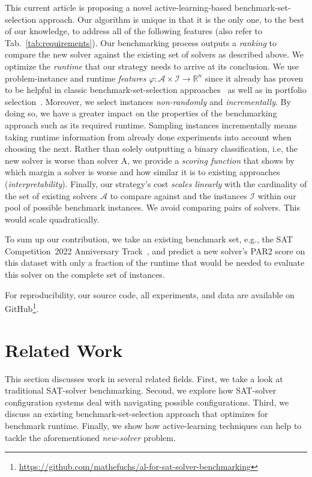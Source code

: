 \documentclass[runningheads]{llncs}
\begin{document}
This current article is proposing a novel active-learning-based benchmark-set-selection approach.
Our algorithm is unique in that it is the only one, to the best of our knowledge, to address all of the following features (also refer to Tab.~\ref{tab:requirements}).
Our benchmarking process outputs a \textit{ranking} to compare the new solver against the existing set of solvers as described above.
We optimize the \textit{runtime} that our strategy needs to arrive at its conclusion.
We use problem-instance and runtime \textit{features} $\varphi\!: \mathcal{A} \times \mathcal{I} \rightarrow \mathbb{R}^n$ since it already has proven to be helpful in classic benchmark-set-selection approaches~\cite{HoosKSS13} as well as in portfolio selection~\cite{CollauttiMMO13,NgokoCT19}.
Moreover, we select instances \textit{non-randomly} and \textit{incrementally}.
By doing so, we have a greater impact on the properties of the benchmarking approach such as its required runtime.
Sampling instances incrementally means taking runtime information from already done experiments into account when choosing the next.
Rather than solely outputting a binary classification, i.e, the new solver is worse than solver A, we provide a \textit{scoring function} that shows by which margin a solver is worse and how similar it is to existing approaches (\textit{interpretability}).
Finally, our strategy's cost \textit{scales linearly} with the cardinality of the set of existing solvers $\mathcal{A}$ to compare against and the instances $\mathcal{I}$ within our pool of possible benchmark instances.
We avoid comparing pairs of solvers.
This would scale quadratically.

To sum up our contribution, we take an existing benchmark set, e.g., the SAT Competition~2022 Anniversary Track~\cite{sat2022}, and predict a new solver's PAR2 score on this dataset with only a fraction of the runtime that would be needed to evaluate this solver on the complete set of instances.

For reproducibility, our source code, all experiments, and data are available on GitHub\footnote{\url{https://github.com/mathefuchs/al-for-sat-solver-benchmarking}}.


\section{Related Work}
This section discusses work in several related fields.
First, we take a look at traditional SAT-solver benchmarking.
Second, we explore how SAT-solver configuration systems deal with navigating possible configurations.
Third, we discuss an existing benchmark-set-selection approach that optimizes for benchmark runtime.
Finally, we show how active-learning techniques can help to tackle the aforementioned \textit{new-solver} problem.
\end{document}
